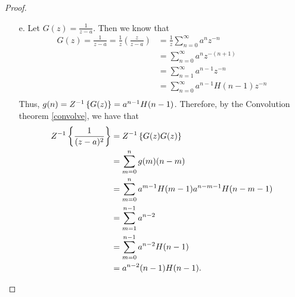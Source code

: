 \begin{proof}
\begin{enumerate}
    \item[e.] Let $\displaystyle G(z) = \frac{1}{z-a}$.
      Then we know that
      \begin{align*}
        G(z) = \frac{1}{z-a} = \frac{1}{z}\left(\frac{z}{z-a}\right)
        &= \frac{1}{z} \sum_{n=0}^\infty a^{n} z^{-n} \\
        &=\sum_{n=0}^\infty a^{n} z^{-(n+1)} \\
        &= \sum_{n=1}^\infty a^{n-1} z^{-n} \\
        &= \sum_{n=0}^\infty a^{n-1}H(n-1) z^{-n} \\
      \end{align*}
      Thus, $g(n) = Z^{-1}\left\{ {G(z)} \right\} = a^{n-1}H(n-1)$. Therefore, by the Convolution theorem \eqref{convolve},
      we have that
      \begin{align*}
        Z^{-1}\left\{ {\frac{1}{(z-a)^2}} \right\} &= Z^{-1}\left\{ {G(z)G(z)} \right\} \\
        &= \sum_{m=0}^n g(m)(n-m) \\
        &= \sum_{m=0}^n a^{m-1}H(m-1) a^{n-m-1}H(n-m-1) \\
        &= \sum_{m=1}^{n-1} a^{n-2} \\
        &= \sum_{m=0}^{n-1} a^{n-2} H(n-1) \\
        &= a^{n-2}(n-1)H(n-1).
      \end{align*}
  \end{enumerate}
\end{proof}
\newpage
